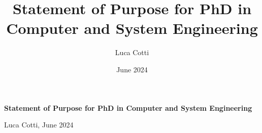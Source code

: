 \documentclass[a4paper,10pt]{article} %
\title{Statement of Purpose for PhD in Computer and System Engineering}
\author{Luca Cotti}
\date{June 2024}
\begin{document}

\begin{titlepage}
    \begin{center}
        \Large{\textbf{Statement of Purpose for PhD in Computer and System Engineering}}\\

        \vspace{4mm}
    
        \normalsize{Luca Cotti, June 2024}\\
    \end{center}
\end{titlepage}


\end{document}
